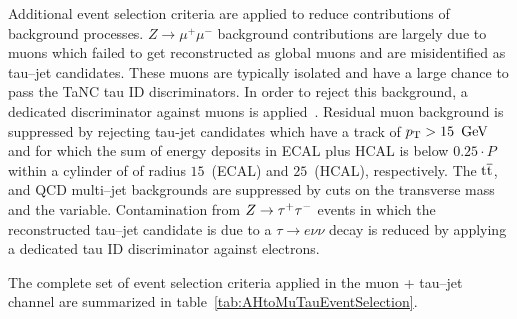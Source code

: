 Additional event selection criteria are applied to reduce contributions of
background processes. $Z \rightarrow \mu^{+} \mu^{-}$ background contributions
are largely due to muons which failed to get reconstructed as global muons and
are misidentified as tau--jet candidates. These muons are typically isolated and
have a large chance to pass the TaNC tau ID discriminators.  In order to reject
this background, a dedicated discriminator against muons is
applied~\cite{CMS-PAS-PFT-08-001}. Residual muon background is suppressed by
rejecting tau-jet candidates which have a track of $p_{\mathrm{T}} > 15~\,\text{Ge\hspace{-.08em}V}$ and for which
the sum of energy deposits in ECAL plus HCAL is below $0.25 \cdot P$ within a
cylinder of of radius $15$~\centi\meter (ECAL) and $25$~\centi\meter (HCAL),
respectively.  The $\mathrm{t}\overline{\mathrm{t}}$, \WpJets and QCD multi--jet backgrounds are
suppressed by cuts on the transverse mass and the \Pzeta variable.
Contamination from $Z \to \tau^+\tau^-$ events in which the reconstructed tau--jet
candidate is due to a $\tau \to e \nu \nu$ decay is reduced by applying a
dedicated tau ID discriminator against electrons.

The complete set of event selection criteria applied in the muon +
tau--jet channel are summarized in table~\ref{tab:AHtoMuTauEventSelection}.

